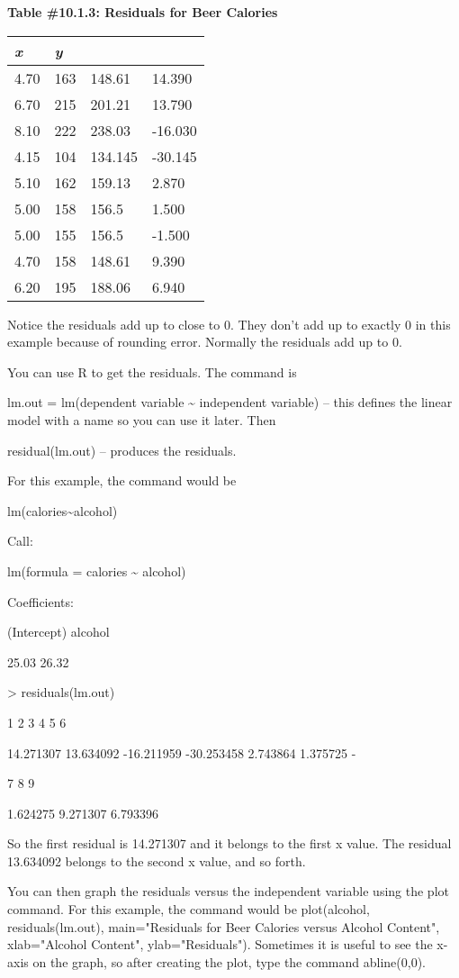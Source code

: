 \documentclass[]{book}
\begin{document}
\textbf{Table \#10.1.3: Residuals for Beer Calories}

\begin{longtable}[]{@{}llll@{}}
\toprule
\emph{x} & \emph{y} & &\tabularnewline
\midrule
\endhead
4.70 & 163 & 148.61 & 14.390\tabularnewline
6.70 & 215 & 201.21 & 13.790\tabularnewline
8.10 & 222 & 238.03 & -16.030\tabularnewline
4.15 & 104 & 134.145 & -30.145\tabularnewline
5.10 & 162 & 159.13 & 2.870\tabularnewline
5.00 & 158 & 156.5 & 1.500\tabularnewline
5.00 & 155 & 156.5 & -1.500\tabularnewline
4.70 & 158 & 148.61 & 9.390\tabularnewline
6.20 & 195 & 188.06 & 6.940\tabularnewline
\bottomrule
\end{longtable}

Notice the residuals add up to close to 0. They don't add up to exactly
0 in this example because of rounding error. Normally the residuals add
up to 0.

You can use R to get the residuals. The command is

lm.out = lm(dependent variable \textasciitilde{} independent variable) -- this defines
the linear model with a name so you can use it later. Then

residual(lm.out) -- produces the residuals.

For this example, the command would be

lm(calories\textasciitilde{}alcohol)

Call:

lm(formula = calories \textasciitilde{} alcohol)

Coefficients:

(Intercept) alcohol

25.03 26.32

\textgreater{} residuals(lm.out)

1 2 3 4 5 6

14.271307 13.634092 -16.211959 -30.253458 2.743864 1.375725 -

7 8 9

1.624275 9.271307 6.793396

So the first residual is 14.271307 and it belongs to the first x value.
The residual 13.634092 belongs to the second x value, and so forth.

You can then graph the residuals versus the independent variable using
the plot command. For this example, the command would be plot(alcohol,
residuals(lm.out), main="Residuals for Beer Calories versus Alcohol
Content", xlab="Alcohol Content", ylab="Residuals"). Sometimes it
is useful to see the x-axis on the graph, so after creating the plot,
type the command abline(0,0).
\end{document}
